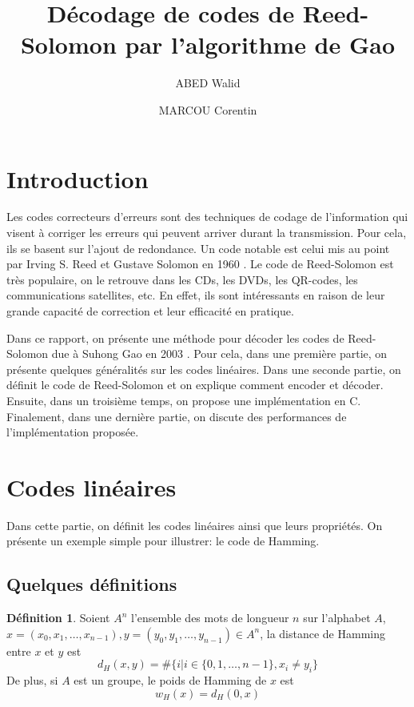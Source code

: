 \documentclass{article}
\title{Décodage de codes de Reed-Solomon par l'algorithme de Gao}
\author{ABED Walid \and MARCOU Corentin}
\theoremstyle{definition}
\newtheorem{definition}{Définition}
\theoremstyle{remark}
\begin{document}
\maketitle

\tableofcontents

\section{Introduction}
\label{sec:intro}

Les codes correcteurs d'erreurs sont des techniques de codage de l'information qui visent à corriger les erreurs qui peuvent arriver durant la transmission. Pour cela, ils se basent sur l'ajout de redondance. Un code notable est celui mis au point par Irving S. Reed et Gustave Solomon en 1960 \cite{RS1960}. Le code de Reed-Solomon est très populaire, on le retrouve dans les CDs, les DVDs, les QR-codes, les communications satellites, etc. En effet, ils sont intéressants en raison de leur grande capacité de correction et leur efficacité en pratique. 

Dans ce rapport, on présente une méthode pour décoder les codes de Reed-Solomon due à Suhong Gao en 2003 \cite{Gao2003}. Pour cela, dans une première partie, on présente quelques généralités sur les codes linéaires. Dans une seconde partie, on définit le code de Reed-Solomon et on explique comment encoder et décoder. Ensuite, dans un troisième temps, on propose une implémentation en C. Finalement, dans une dernière partie, on discute des performances de l'implémentation proposée.

\section{Codes linéaires}
\label{sec:lin}

Dans cette partie, on définit les codes linéaires ainsi que leurs propriétés. On présente un exemple simple pour illustrer: le code de Hamming.

\subsection{Quelques définitions}
\label{subsec:lin-def}

\begin{definition}
\label{def1}
    Soient $A^n$ l'ensemble des mots de longueur $n$ sur l'alphabet $A$, $x = (x_{0}, x_{1}, \dots, x_{n-1}), y = (y_{0}, y_{1}, \dots, y_{n-1}) \in A^n$, la distance de Hamming entre $x$ et $y$ est
    \[d_H(x, y) = \#\{i | i \in \{0, 1, \dots, n-1\}, x_i \ne y_i\} \]
    De plus, si $A$ est un groupe, le poids de Hamming de $x$ est
    \[ w_H(x) = d_H(0, x) \]
\end{definition}
\end{document}

